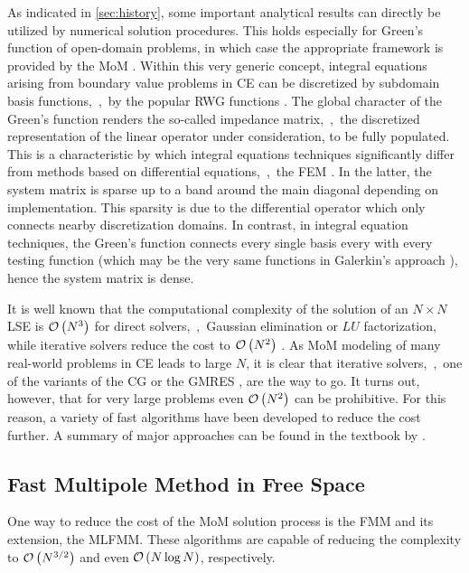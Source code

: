 As indicated in \cref{sec:history}, some important analytical results can
directly be utilized by numerical solution procedures.
This holds especially for Green's function of open-domain problems, in which
case the appropriate framework is provided by the \ac{MoM}
\cite{Harrington1993}.
Within this very generic concept, integral equations arising from boundary value
problems in \ac{CE} can be discretized by subdomain basis functions,~\eg,~by
the popular \ac{RWG} functions \cite{Rao1982}.
The global character of the Green's function renders the so-called impedance
matrix,~\ie,~the discretized representation of the linear operator under
consideration, to be fully populated.
This is a characteristic by which integral equations techniques significantly
differ from methods based on differential equations,~\eg,~the \ac{FEM}
\cite{Jin2014}.
In the latter, the system matrix is sparse up to a band around the main diagonal
depending on implementation.
This sparsity is due to the differential operator which only connects nearby
discretization domains.
In contrast, in integral equation techniques, the Green's function connects 
every single basis every with every testing function (which may be the very
same functions in Galerkin's approach \cite{Harrington1993}), hence the 
system matrix is dense.

It is well known that the computational complexity of the solution of an
$N \times N$ \ac{LSE} is $\mathcal{O} \left( N^3 \right)$ for direct
solvers,~\eg,~Gaussian elimination or $LU$ factorization, while iterative
solvers reduce the cost to $\mathcal{O} \left( N^2 \right)$ \cite{Strang2010}.
As \ac{MoM} modeling of many real-world problems in \ac{CE} leads to large $N$,
it is clear that iterative solvers,~\eg,~one of the variants of the \ac{CG}
or the \ac{GMRES} \cite{Strang2010}, are the way to go.
It turns out, however, that for very large problems even $\mathcal{O} \left( N^2 \right)$
can be prohibitive.
For this reason, a variety of fast algorithms have been developed to reduce the
cost further.
A summary of major approaches can be found in the textbook by
\textcite[Chapter~11]{Jin2015}.







\subsection{Fast Multipole Method in Free Space}

One way to reduce the cost of the \ac{MoM} solution process is the \ac{FMM}
and its extension, the \ac{MLFMM}.
These algorithms are capable of reducing the complexity to $\mathcal{O} \left( N^{3/2} \right)$
and even $\mathcal{O} \left( N \log N \right)$, respectively.

